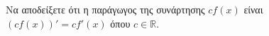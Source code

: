 Να αποδείξετε ότι η παράγωγος της συνάρτησης $ cf(x) $ είναι $ (cf(x))'=cf'(x) $ όπου $ c\in\mathbb{R} $.
